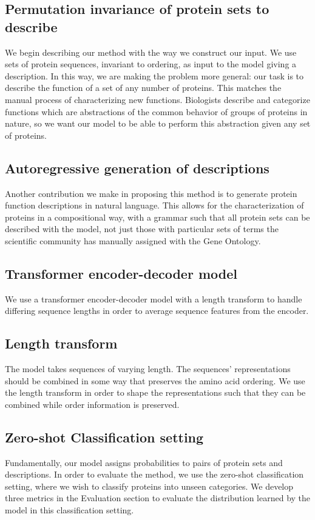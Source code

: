 \documentclass{article}
\begin{document}
    \subsection{Permutation invariance of protein sets to describe}
    We begin describing our method with the way we construct our input. We use sets of protein sequences, invariant to ordering, as input to the model giving a description. In this way, we are making the problem more general: our task is to describe the function of a set of any number of proteins. This matches the manual process of characterizing new functions. Biologists describe and categorize functions which are abstractions of the common behavior of groups of proteins in nature, so we want our model to be able to perform this abstraction given any set of proteins.
    \subsection{Autoregressive generation of descriptions}
    Another contribution we make in proposing this method is to generate protein function descriptions in natural language. This allows for the characterization of proteins in a compositional way, with a grammar such that all protein sets can be described with the model, not just those with particular sets of terms the scientific community has manually assigned with the Gene Ontology.
    \subsection{Transformer encoder-decoder model}
    We use a transformer encoder-decoder model \cite{vaswani2017attention} with a length transform \cite{shu2020latent} to handle differing sequence lengths in order to average sequence features from the encoder.
    \subsection{Length transform}
    The model takes sequences of varying length. The sequences' representations should be combined in some way that preserves the amino acid ordering. We use the length transform in order to shape the representations such that they can be combined while order information is preserved.
    \subsection{Zero-shot Classification setting}
    Fundamentally, our model assigns probabilities to pairs of protein sets and descriptions. In order to evaluate the method, we use the zero-shot classification setting, where we wish to classify proteins into unseen categories. We develop three metrics in the Evaluation section to evaluate the distribution learned by the model in this classification setting.
\end{document}
